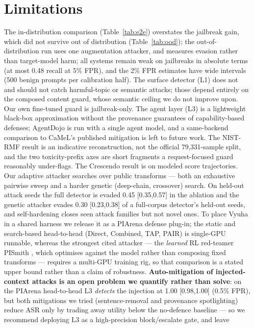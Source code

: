 \documentclass[11pt]{article}
\begin{document}
\section*{Limitations}
The in-distribution comparison (Table~\ref{tab:e2e}) overstates the jailbreak gain, which did not
survive out of distribution (Table~\ref{tab:ood}); the out-of-distribution run uses one augmentation
attacker, and measures evasion rather than target-model harm; all systems remain weak on jailbreaks in absolute terms
(at most 0.48 recall at 5\% FPR), and the 2\% FPR estimates have wide intervals (500 benign prompts per
calibration half). The surface detector (L1) does not and should not catch harmful-topic or semantic attacks; those
depend entirely on the composed content guard, whose semantic ceiling we do not improve upon. Our own
fine-tuned guard is jailbreak-only. The agent layer (L3) is a lightweight black-box approximation
without the provenance guarantees of capability-based defenses; AgentDojo is run with a single agent model,
and a same-backend comparison to CaMeL's published mitigation is left to future work.
The NIST-RMF result is an indicative reconstruction, not the official 79{,}331-sample split, and the
two toxicity-prefix axes are short fragments a request-focused guard reasonably under-flags. The
Crescendo result is on modeled score trajectories. Our adaptive attacker searches over
public transforms --- both an exhaustive pairwise sweep and a harder genetic (deep-chain, crossover)
search. On held-out attack seeds the full detector is evaded 0.45 [0.35,0.57] in the ablation and the
genetic attacker evades 0.30 [0.23,0.38] of a full-corpus detector's held-out seeds, and self-hardening closes seen attack families
but not novel ones. To place Vyuha in
a shared harness we release it as a PIArena \citep{piarena} defense plug-in; the static and
search-based head-to-head (Direct, Combined, TAP, PAIR) is single-GPU runnable, whereas the strongest
cited attacker --- the \emph{learned} RL red-teamer PISmith \citep{pismith}, which optimises against
the model rather than composing fixed transforms --- requires a multi-GPU training rig, so that
comparison is a stated upper bound rather than a claim of robustness. \textbf{Auto-mitigation of
injected-context attacks is an open problem we quantify rather than solve}: on the PIArena head-to-head
L3 \emph{detects} the injection at 1.00 [0.98,1.00] (0.5\% FPR), but both mitigations we tried
(sentence-removal and provenance spotlighting) reduce ASR only by trading away utility below the
no-defence baseline --- so we recommend deploying L3 as a high-precision block/escalate gate, and leave
\end{document}
